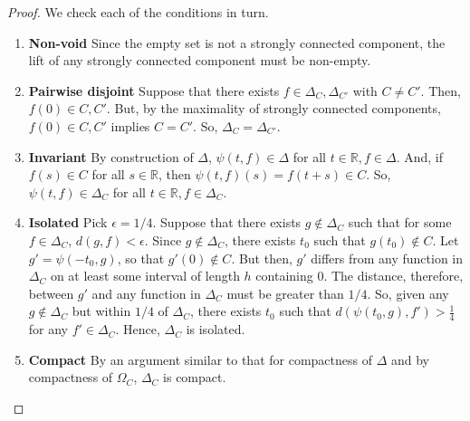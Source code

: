 \documentclass[11pt]{article}
\begin{document}
\begin{proof}
We check each of the conditions in turn.
\begin{enumerate}
\item \textbf{Non-void}
Since the empty set is not a strongly connected component, the lift of any strongly connected component must be non-empty.
\item \textbf{Pairwise disjoint}
Suppose that there exists $f \in \Delta_C, \Delta_{C'}$ with $C \neq C'$.  Then, $f(0) \in C, C'$.  But, by the maximality of strongly connected components, $f(0) \in C, C'$ implies $C = C'$.  So, $\Delta_{C} = \Delta_{C'}$.
\item \textbf{Invariant}
By construction of $\Delta$, $\psi(t,f) \in \Delta$ for all $t \in \mathbb{R}, f \in \Delta$.  And, if $f(s) \in C$ for all $s \in \mathbb{R}$, then $\psi(t,f)(s) = f(t+s) \in C$.  So, $\psi(t,f) \in \Delta_C$ for all $t \in \mathbb{R}, f \in \Delta_C$.
\item \textbf{Isolated}
Pick $\epsilon = 1/4$.  Suppose that there exists $g \notin \Delta_C$ such that for some $f \in \Delta_C$, $d(g,f) < \epsilon$.  Since $g \notin \Delta_C$, there exists $t_0$ such that $g(t_0) \notin C$.  Let $g' = \psi(-t_0,g)$, so that $g'(0) \notin C$.  But then, $g'$ differs from any function in $\Delta_C$ on at least some interval of length $h$ containing $0$.  The distance, therefore, between $g'$ and any function in $\Delta_C$ must be greater than $1/4$.  So, given any $g \notin \Delta_C$ but within $1/4$ of $\Delta_C$, there exists $t_0$ such that $d(\psi(t_0, g),f') > \frac{1}{4}$ for any $f' \in \Delta_C$.  Hence, $\Delta_C$ is isolated.
\item \textbf{Compact}
By an argument similar to that for compactness of $\Delta$ and by compactness of $\Omega_C$, $\Delta_C$ is compact.




\end{enumerate}
\end{proof}
\end{document}
